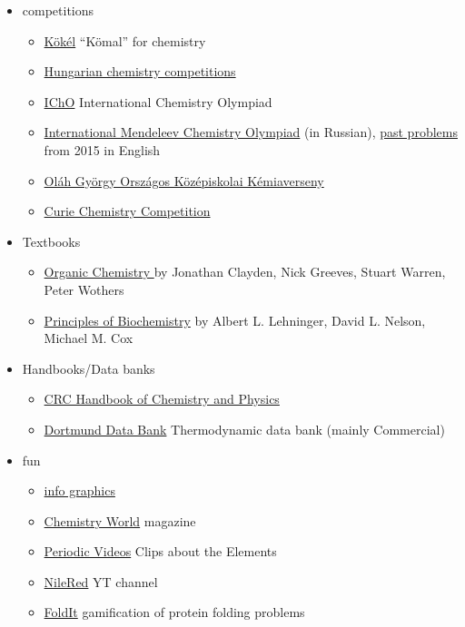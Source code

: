 \documentclass{article}
\begin{document}
\begin{itemize}
    \item competitions
    \begin{itemize}
        \item \href{http://www.kokel.mke.org.hu/}{Kökél} ``Kömal'' for chemistry
        \item \href{http://kemia.apaczai.elte.hu/versenyek/index.htm}{Hungarian chemistry competitions}
        \item \href{https://www.icho.sk/}{IChO} International Chemistry Olympiad
        \item \href{http://www.chem.msu.ru/rus/olimp/welcome.html}{International Mendeleev Chemistry Olympiad} (in Russian), \href{https://www.eko.ut.ee/mko/}{past problems} from 2015 in English 
        \item \href{https://olahverseny.szasz.bme.hu/}{Oláh György Országos Középiskolai Kémiaverseny}
        \item \href{http://curiealapitvany.hu/}{Curie Chemistry Competition}
    \end{itemize}
    \item Textbooks
    \begin{itemize}
        \item \href{https://www.goodreads.com/en/book/show/1957892.Organic_Chemistry}{Organic Chemistry }  by Jonathan Clayden, Nick Greeves, Stuart Warren, Peter Wothers
        \item \href{https://www.goodreads.com/book/show/239513.Principles_of_Biochemistry}{Principles of Biochemistry}  by Albert L. Lehninger, David L. Nelson, Michael M. Cox
    \end{itemize}
    \item Handbooks/Data banks
    \begin{itemize}
        \item \href{https://en.wikipedia.org/wiki/CRC_Handbook_of_Chemistry_and_Physics}{CRC Handbook of Chemistry and Physics}
        \item \href{http://www.ddbst.com/}{Dortmund Data Bank} Thermodynamic data bank (mainly Commercial)
    \end{itemize}
    
    \item fun
    \begin{itemize}
        \item \href{https://www.compoundchem.com/}{info graphics}
        \item \href{https://www.chemistryworld.com/}{Chemistry World} magazine
        \item \href{http://www.periodicvideos.com/}{Periodic Videos} Clips about the Elements
        \item \href{https://www.youtube.com/user/TheRedNile}{NileRed} YT channel
        \item \href{https://fold.it/}{FoldIt} gamification of protein folding problems
    \end{itemize}
    

\end{itemize}
\end{document}
